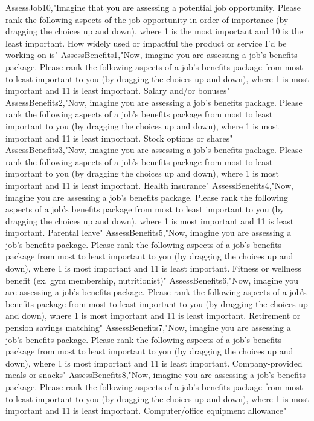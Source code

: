 \begin{appendices}
AssessJob10,"Imagine that you are assessing a potential job opportunity. Please rank the following aspects of the job opportunity in order of importance (by dragging the choices up and down), where 1 is the most important and 10 is the least important. How widely used or impactful the product or service I'd be working on is"
AssessBenefits1,"Now, imagine you are assessing a job's benefits package. Please rank the following aspects of a job's benefits package from most to least important to you (by dragging the choices up and down), where 1 is most important and 11 is least important. Salary and/or bonuses"
AssessBenefits2,"Now, imagine you are assessing a job's benefits package. Please rank the following aspects of a job's benefits package from most to least important to you (by dragging the choices up and down), where 1 is most important and 11 is least important. Stock options or shares"
AssessBenefits3,"Now, imagine you are assessing a job's benefits package. Please rank the following aspects of a job's benefits package from most to least important to you (by dragging the choices up and down), where 1 is most important and 11 is least important. Health insurance"
AssessBenefits4,"Now, imagine you are assessing a job's benefits package. Please rank the following aspects of a job's benefits package from most to least important to you (by dragging the choices up and down), where 1 is most important and 11 is least important. Parental leave"
AssessBenefits5,"Now, imagine you are assessing a job's benefits package. Please rank the following aspects of a job's benefits package from most to least important to you (by dragging the choices up and down), where 1 is most important and 11 is least important. Fitness or wellness benefit (ex. gym membership, nutritionist)"
AssessBenefits6,"Now, imagine you are assessing a job's benefits package. Please rank the following aspects of a job's benefits package from most to least important to you (by dragging the choices up and down), where 1 is most important and 11 is least important. Retirement or pension savings matching"
AssessBenefits7,"Now, imagine you are assessing a job's benefits package. Please rank the following aspects of a job's benefits package from most to least important to you (by dragging the choices up and down), where 1 is most important and 11 is least important. Company-provided meals or snacks"
AssessBenefits8,"Now, imagine you are assessing a job's benefits package. Please rank the following aspects of a job's benefits package from most to least important to you (by dragging the choices up and down), where 1 is most important and 11 is least important. Computer/office equipment allowance"

\end{appendices}
